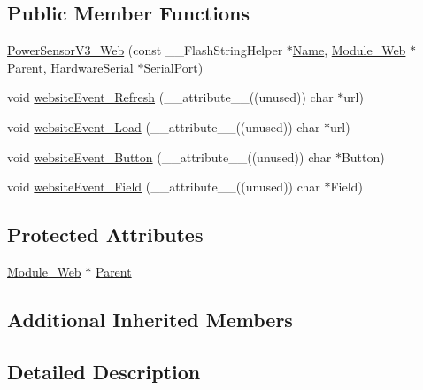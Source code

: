 \subsection*{Public Member Functions}
\begin{DoxyCompactItemize}
\item 
\hyperlink{class_power_sensor_v3___web_ad7ac3b7dbf2e4cef928121ad92f7f528}{Power\+Sensor\+V3\+\_\+\+Web} (const \+\_\+\+\_\+\+Flash\+String\+Helper $\ast$\hyperlink{class_common_aeea91a726dbe988e515057b32ba0726f}{Name}, \hyperlink{class_module___web}{Module\+\_\+\+Web} $\ast$\hyperlink{class_power_sensor_v3___web_a9449ff1f7a7ae15dbd2580ba297cf7ab}{Parent}, Hardware\+Serial $\ast$Serial\+Port)
\item 
void \hyperlink{class_power_sensor_v3___web_aa5516c0a4c5daa0f27a89e86abb0db26}{website\+Event\+\_\+\+Refresh} (\+\_\+\+\_\+attribute\+\_\+\+\_\+((unused)) char $\ast$url)
\item 
void \hyperlink{class_power_sensor_v3___web_ac5792ce60508b9789927171c6aa10945}{website\+Event\+\_\+\+Load} (\+\_\+\+\_\+attribute\+\_\+\+\_\+((unused)) char $\ast$url)
\item 
void \hyperlink{class_power_sensor_v3___web_a6032d4ab98373d58ac532c4aa03c8f26}{website\+Event\+\_\+\+Button} (\+\_\+\+\_\+attribute\+\_\+\+\_\+((unused)) char $\ast$Button)
\item 
void \hyperlink{class_power_sensor_v3___web_a80d9707667d1ac9f6dc1ccf1b6a07287}{website\+Event\+\_\+\+Field} (\+\_\+\+\_\+attribute\+\_\+\+\_\+((unused)) char $\ast$Field)
\end{DoxyCompactItemize}
\subsection*{Protected Attributes}
\begin{DoxyCompactItemize}
\item 
\hyperlink{class_module___web}{Module\+\_\+\+Web} $\ast$ \hyperlink{class_power_sensor_v3___web_a9449ff1f7a7ae15dbd2580ba297cf7ab}{Parent}
\end{DoxyCompactItemize}
\subsection*{Additional Inherited Members}


\subsection{Detailed Description}


